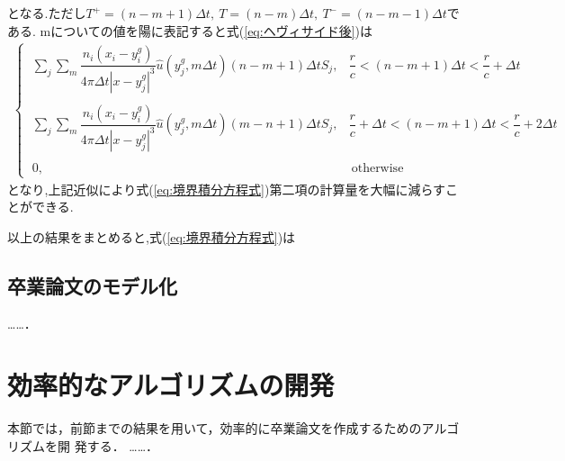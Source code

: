 \documentclass[dvipdfmx]{ampbt}
\newcommand{\rme}{\mathrm{e}}
\begin{document}
となる.ただし$T^+ =(n-m+1)\Delta t,\ T =(n-m)\Delta t,\ T^- =(n-m-1)\Delta t$である.
mについての値を陽に表記すると式(\ref{eq:ヘヴィサイド後})は
\begin{align}
\begin{cases}
\; \displaystyle\sum_j \sum_m \dfrac{n_i(x_i-y^g_i)}{4\pi \Delta t |x-y^g_j|^3}  \hat{u}(y^g_j,m\Delta t)(n-m+1)\Delta t S_j, &\dfrac{r}{c} < (n-m+1)\Delta t < \dfrac{r}{c}+\Delta t \nonumber\\  \\
\; \displaystyle\sum_j \sum_m \dfrac{n_i(x_i-y^g_i)}{4\pi \Delta t |x-y^g_j|^3}  \hat{u}(y^g_j,m\Delta t)(m-n+1)\Delta t S_j, &\dfrac{r}{c}+\Delta t < (n-m+1)\Delta t < \dfrac{r}{c}+2\Delta t \nonumber\\  \\
\; 0, &\ \mbox{otherwise}
\end{cases}
\end{align}
となり,上記近似により式(\ref{eq:境界積分方程式})第二項の計算量を大幅に減らすことができる.\par
以上の結果をまとめると,式(\ref{eq:境界積分方程式})は


%




\subsection{卒業論文のモデル化}
……．

\section{効率的なアルゴリズムの開発}
本節では，前節までの結果を用いて，効率的に卒業論文を作成するためのアルゴリズムを開
発する．
……．
\end{document}
